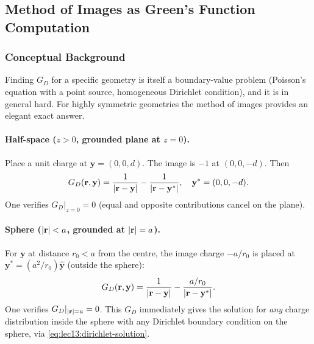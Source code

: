 \subsection{Method of Images as Green's Function Computation}\label{subsec:lec13-images}

\subsubsection*{Conceptual Background}
Finding $G_D$ for a specific geometry is itself a boundary-value problem
(Poisson's equation with a point source, homogeneous Dirichlet condition), and it is in
general hard.  For highly symmetric geometries the method of images provides an elegant
exact answer.

\paragraph{Half-space ($z > 0$, grounded plane at $z=0$).}
Place a unit charge at $\mathbf{y} = (0,0,d)$.  The image is $-1$ at
$(0,0,-d)$.  Then
\begin{equation}\label{eq:lec13:GD-halfspace}
  G_D(\mathbf{r},\mathbf{y}) = \frac{1}{|\mathbf{r} - \mathbf{y}|} - \frac{1}{|\mathbf{r} - \mathbf{y}^*|},
  \quad
  \mathbf{y}^* = (0,0,-d).
\end{equation}
One verifies $G_D|_{z=0} = 0$ (equal and opposite contributions cancel on the plane).

\paragraph{Sphere ($|\mathbf{r}| < a$, grounded at $|\mathbf{r}| = a$).}
For $\mathbf{y}$ at distance $r_0 < a$ from the centre, the image charge $-a/r_0$
is placed at $\mathbf{y}^* = (a^2/r_0)\hat{\mathbf{y}}$ (outside the sphere):
\begin{equation}\label{eq:lec13:GD-sphere}
  G_D(\mathbf{r},\mathbf{y}) = \frac{1}{|\mathbf{r} - \mathbf{y}|} - \frac{a/r_0}{|\mathbf{r} - \mathbf{y}^*|}.
\end{equation}
One verifies $G_D|_{|\mathbf{r}|=a} = 0$.  This $G_D$ immediately gives the solution for
\emph{any} charge distribution inside the sphere with any Dirichlet boundary condition on
the sphere, via \eqref{eq:lec13:dirichlet-solution}.

